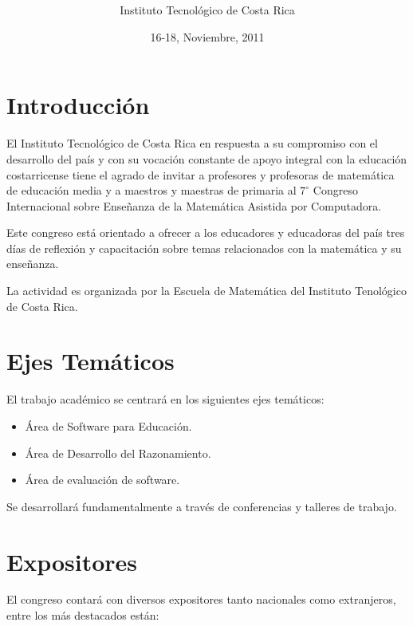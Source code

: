 \documentclass[10pt, notumble, letterpaper]{leaflet}
\title{\vspace*{5cm} }%
\author{Instituto Tecnológico de Costa Rica}
\date{16-18, Noviembre, 2011 }
\begin{document}
\maketitle

\thispagestyle{empty}

\section{Introducción}

El Instituto Tecnológico de Costa Rica en respuesta a su compromiso con el desarrollo del país y con su vocación constante de apoyo integral con la educación costarricense tiene el agrado de invitar a profesores y profesoras de matemática de educación media y a maestros y maestras de primaria al $7^\circ$ Congreso Internacional sobre Enseñanza de la Matemática Asistida por Computadora.

Este congreso está orientado a ofrecer a los educadores y educadoras del país tres días de reflexión y capacitación sobre temas relacionados con la matemática y su enseñanza.

La actividad es organizada por la Escuela de Matemática del Instituto Tenológico de Costa Rica.

\newpage

\section{Ejes Temáticos}

El trabajo académico se centrará en los siguientes ejes temáticos:

\begin{itemize}
    \item Área de Software para Educación.

    \item Área de Desarrollo del Razonamiento.

    \item Área de evaluación de software.
\end{itemize}

Se desarrollará fundamentalmente a través de conferencias y talleres de trabajo.


\section{Expositores}

El congreso contará con diversos expositores tanto nacionales como extranjeros, entre los más destacados están:
\end{document}
